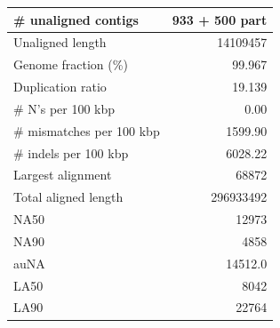 \documentclass[12pt,a4paper]{article}
\begin{document}
\begin{table}[ht]
\begin{center}
\begin{tabular}{|l*{1}{|r}|}
\# unaligned contigs & 933 + 500 part \\ \hline
Unaligned length & 14109457 \\ \hline
Genome fraction (\%) & 99.967 \\ \hline
Duplication ratio & 19.139 \\ \hline
\# N's per 100 kbp & 0.00 \\ \hline
\# mismatches per 100 kbp & 1599.90 \\ \hline
\# indels per 100 kbp & 6028.22 \\ \hline
Largest alignment & 68872 \\ \hline
Total aligned length & 296933492 \\ \hline
NA50 & 12973 \\ \hline
NA90 & 4858 \\ \hline
auNA & 14512.0 \\ \hline
LA50 & 8042 \\ \hline
LA90 & 22764 \\ \hline
\end{tabular}
\end{center}
\end{table}
\end{document}
